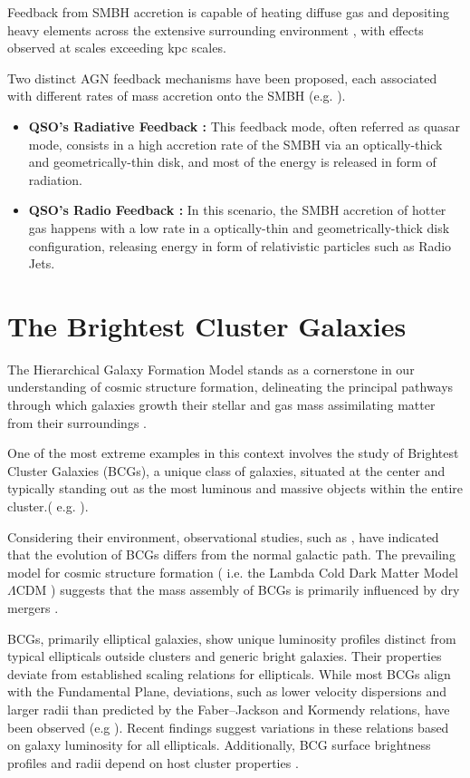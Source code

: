 Feedback from SMBH accretion is capable of heating diffuse gas \cite{2005Natur.433..604D} and depositing heavy elements across the extensive surrounding environment \cite{2000ApJ...539L..13G}, with effects observed at scales exceeding kpc scales. %

Two distinct AGN feedback mechanisms have been proposed, each associated with different rates of mass accretion onto the SMBH (e.g. \cite{2012ARA&A..50..455F, 2017NatAs...1E.165H}).
\begin{itemize}
	\item \textbf{QSO's Radiative Feedback :} This feedback mode, often referred as quasar mode, consists in a high accretion rate of the SMBH via an optically-thick and geometrically-thin disk, and most of the energy is released in form of radiation.
	\item \textbf{QSO's Radio Feedback :} In this scenario, the SMBH accretion of hotter gas happens with a low rate in a optically-thin and geometrically-thick disk configuration, releasing energy in form of relativistic particles such as Radio Jets.
\end{itemize}


\section{The Brightest Cluster Galaxies }
The Hierarchical Galaxy Formation Model stands as a cornerstone in our understanding of cosmic structure formation, delineating the principal pathways through which galaxies growth their stellar and gas mass assimilating matter from their surroundings \cite{1994MNRAS.271..781C}.

One of the most extreme examples in this context involves the study of Brightest Cluster Galaxies (BCGs), a unique class of galaxies, situated at the center and typically standing out as the most luminous and massive objects within the entire cluster.( e.g. \cite{2015MNRAS.448....2W} ).

Considering their environment, observational studies, such as \cite{2020MNRAS.498.2719T}, have indicated that the evolution of BCGs differs from the normal galactic path. The prevailing model for cosmic structure formation ( i.e. the Lambda Cold Dark Matter Model $\Lambda$CDM ) suggests that the mass assembly of BCGs is primarily influenced by dry mergers \cite{2007MNRAS.375....2D, 2019ApJ...881..150C}.

BCGs, primarily elliptical galaxies, show unique luminosity profiles distinct from typical ellipticals outside clusters and generic bright galaxies. Their properties deviate from established scaling relations for ellipticals. While most BCGs align with the Fundamental Plane, deviations, such as lower velocity dispersions and larger radii than predicted by the Faber–Jackson and Kormendy relations, have been observed (e.g \cite{1991ApJ...375...15O}). Recent findings suggest variations in these relations based on galaxy luminosity for all ellipticals. Additionally, BCG surface brightness profiles and radii depend on host cluster properties \cite{2005MNRAS.364.1354B}. 

